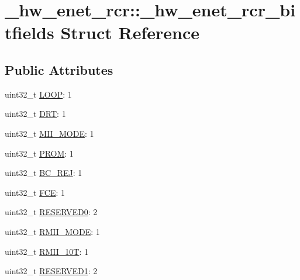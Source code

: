 \hypertarget{struct__hw__enet__rcr_1_1__hw__enet__rcr__bitfields}{}\section{\+\_\+hw\+\_\+enet\+\_\+rcr\+:\+:\+\_\+hw\+\_\+enet\+\_\+rcr\+\_\+bitfields Struct Reference}
\label{struct__hw__enet__rcr_1_1__hw__enet__rcr__bitfields}
\subsection*{Public Attributes}
\begin{DoxyCompactItemize}
\item 
uint32\+\_\+t \hyperlink{struct__hw__enet__rcr_1_1__hw__enet__rcr__bitfields_ad307872044d55856a47c82fd3bdbe8b6}{L\+O\+OP}\+: 1
\item 
uint32\+\_\+t \hyperlink{struct__hw__enet__rcr_1_1__hw__enet__rcr__bitfields_a541730787ab6bcbf47c46202c82696eb}{D\+RT}\+: 1
\item 
uint32\+\_\+t \hyperlink{struct__hw__enet__rcr_1_1__hw__enet__rcr__bitfields_a03cc12bde54c9fc1e0988552f83c99e7}{M\+I\+I\+\_\+\+M\+O\+DE}\+: 1
\item 
uint32\+\_\+t \hyperlink{struct__hw__enet__rcr_1_1__hw__enet__rcr__bitfields_a315cd0333bc58349125f8123febfd3f4}{P\+R\+OM}\+: 1
\item 
uint32\+\_\+t \hyperlink{struct__hw__enet__rcr_1_1__hw__enet__rcr__bitfields_a911335bcde3400228acf60ed629f8fc5}{B\+C\+\_\+\+R\+EJ}\+: 1
\item 
uint32\+\_\+t \hyperlink{struct__hw__enet__rcr_1_1__hw__enet__rcr__bitfields_ad34e972ed7b58d633b1044446afdbbb6}{F\+CE}\+: 1
\item 
uint32\+\_\+t \hyperlink{struct__hw__enet__rcr_1_1__hw__enet__rcr__bitfields_a4aa7b3a3b4fbf17993277de8438480bf}{R\+E\+S\+E\+R\+V\+E\+D0}\+: 2
\item 
uint32\+\_\+t \hyperlink{struct__hw__enet__rcr_1_1__hw__enet__rcr__bitfields_ae75f27db57facb0a4d37869cd58c36eb}{R\+M\+I\+I\+\_\+\+M\+O\+DE}\+: 1
\item 
uint32\+\_\+t \hyperlink{struct__hw__enet__rcr_1_1__hw__enet__rcr__bitfields_a2781e90ad65c82d04e2ebcef2ac0e20f}{R\+M\+I\+I\+\_\+10T}\+: 1
\item 
uint32\+\_\+t \hyperlink{struct__hw__enet__rcr_1_1__hw__enet__rcr__bitfields_a87daae3f958bd4eab9e22edf9346568f}{R\+E\+S\+E\+R\+V\+E\+D1}\+: 2

\end{DoxyCompactItemize}
